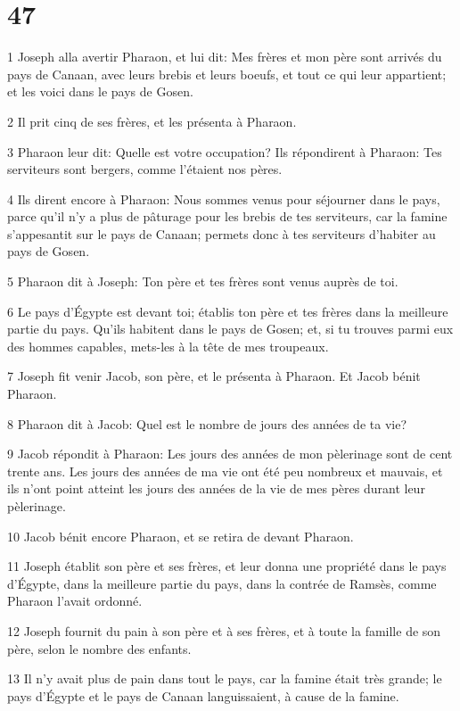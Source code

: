 \chapter{47}

\par 1 Joseph alla avertir Pharaon, et lui dit: Mes frères et mon père sont arrivés du pays de Canaan, avec leurs brebis et leurs boeufs, et tout ce qui leur appartient; et les voici dans le pays de Gosen.
\par 2 Il prit cinq de ses frères, et les présenta à Pharaon.
\par 3 Pharaon leur dit: Quelle est votre occupation? Ils répondirent à Pharaon: Tes serviteurs sont bergers, comme l'étaient nos pères.
\par 4 Ils dirent encore à Pharaon: Nous sommes venus pour séjourner dans le pays, parce qu'il n'y a plus de pâturage pour les brebis de tes serviteurs, car la famine s'appesantit sur le pays de Canaan; permets donc à tes serviteurs d'habiter au pays de Gosen.
\par 5 Pharaon dit à Joseph: Ton père et tes frères sont venus auprès de toi.
\par 6 Le pays d'Égypte est devant toi; établis ton père et tes frères dans la meilleure partie du pays. Qu'ils habitent dans le pays de Gosen; et, si tu trouves parmi eux des hommes capables, mets-les à la tête de mes troupeaux.
\par 7 Joseph fit venir Jacob, son père, et le présenta à Pharaon. Et Jacob bénit Pharaon.
\par 8 Pharaon dit à Jacob: Quel est le nombre de jours des années de ta vie?
\par 9 Jacob répondit à Pharaon: Les jours des années de mon pèlerinage sont de cent trente ans. Les jours des années de ma vie ont été peu nombreux et mauvais, et ils n'ont point atteint les jours des années de la vie de mes pères durant leur pèlerinage.
\par 10 Jacob bénit encore Pharaon, et se retira de devant Pharaon.
\par 11 Joseph établit son père et ses frères, et leur donna une propriété dans le pays d'Égypte, dans la meilleure partie du pays, dans la contrée de Ramsès, comme Pharaon l'avait ordonné.
\par 12 Joseph fournit du pain à son père et à ses frères, et à toute la famille de son père, selon le nombre des enfants.
\par 13 Il n'y avait plus de pain dans tout le pays, car la famine était très grande; le pays d'Égypte et le pays de Canaan languissaient, à cause de la famine.
